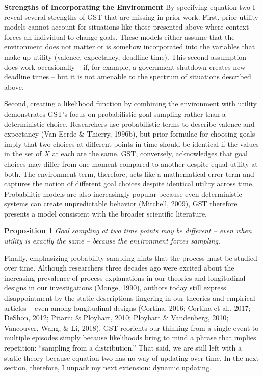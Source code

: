 \documentclass[english,,man]{apa6}
\theoremstyle{definition}
\theoremstyle{definition}
\theoremstyle{definition}
\theoremstyle{remark}
\begin{document}
\textbf{Strengths of Incorporating the Environment} By specifying
equation two I reveal several strengths of GST that are missing in prior
work. First, prior utility models cannot account for situations like
those presented above where context forces an individual to change
goals. These models either assume that the environment does not matter
or is somehow incorporated into the variables that make up utility
(valence, expectancy, deadline time). This second assumption does work
occasionally -- if, for example, a government shutdown creates new
deadline times -- but it is not amenable to the spectrum of situations
described above.

Second, creating a likelihood function by combining the environment with
utility demonstrates GST's focus on probabilistic goal sampling rather
than a deterministic choice. Researchers use probabilistic terms to
describe valence and expectancy (Van Eerde \& Thierry, 1996b), but prior
formulae for choosing goals imply that two choices at different points
in time should be identical if the values in the set of \(X\) at each
are the same. GST, conversely, acknowledges that goal choices may differ
from one moment compared to another despite equal utility at both. The
environment term, therefore, acts like a mathematical error term and
captures the notion of different goal choices despite identical utility
across time. Probabilitic models are also increasingly popular because
even deterministic systems can create unpredictable behavior (Mitchell,
2009), GST therefore presents a model consistent with the broader
scientific literature.

\textbf{Proposition 1} \emph{Goal sampling at two time points may be
different -- even when utility is exactly the same -- because the
environment forces sampling.}

Finally, emphasizing probability sampling hints that the process must be
studied over time. Although researchers three decades ago were excited
about the increasing prevalence of process explanations in our theories
and longitudinal designs in our investigations (Monge, 1990), authors
today still express disappointment by the static descriptions lingering
in our theories and empirical articles -- even among longitudinal
designs (Cortina, 2016; Cortina et al., 2017; DeShon, 2012; Pitariu \&
Ployhart, 2010; Ployhart \& Vandenberg, 2010; Vancouver, Wang, \& Li,
2018). GST reorients our thinking from a single event to multiple
episodes simply because likelihoods bring to mind a phrase that implies
repetition: \enquote{sampling from a distribution.} That said, we are
still left with a static theory because equation two has no way of
updating over time. In the next section, therefore, I unpack my next
extension: dynamic updating.
\end{document}
